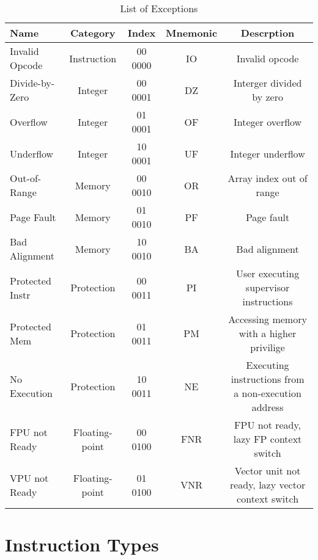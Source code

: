 \documentclass{article}
\begin{document}
    \begin{table}[H]
    \centering
    \caption{List of Exceptions}
    \label{table:except}
    \begin{tabular}{|l|c|c|c|c|}
    
    \hline Name             & Category      & Index     & Mnemonic  & Descrption    \\
    \hline Invalid Opcode   & Instruction   & 00 0000   & IO            & Invalid opcode \\
    \hline Divide-by-Zero   & Integer       & 00 0001   & DZ            & Interger divided by zero \\
    \hline Overflow         & Integer       & 01 0001   & OF            & Integer overflow \\
    \hline Underflow            & Integer       & 10 0001   & UF            & Integer underflow \\
    \hline Out-of-Range     & Memory            & 00 0010   & OR            & Array index out of range \\
    \hline Page Fault       & Memory            & 01 0010   & PF            & Page fault \\
    \hline Bad Alignment        & Memory            & 10 0010   & BA            & Bad alignment \\
    \hline Protected Instr  & Protection        & 00 0011   & PI            & User executing supervisor instructions \\
    \hline Protected Mem        & Protection        & 01 0011   & PM            & Accessing memory with a higher privilige \\
    \hline No Execution     & Protection        & 10 0011   & NE            & Executing instructions from a non-execution address \\
    \hline FPU not Ready        & Floating-point    & 00 0100   & FNR       & FPU not ready, lazy FP context switch \\
    \hline VPU not Ready        & Floating-point    & 01 0100   & VNR       & Vector unit not ready, lazy vector context switch \\
    
    \hline
    \end{tabular}
    \end{table}
    
    \newpage
    
    
\section{Instruction Types}
\end{document}
